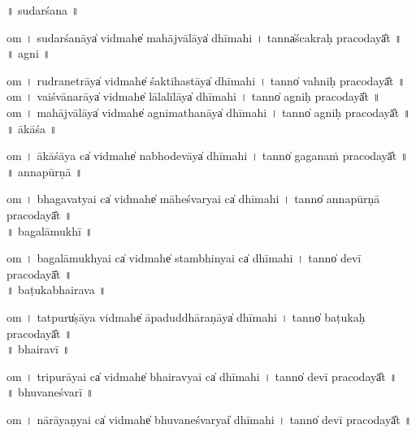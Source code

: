 \documentclass[parskip, DIV=14]{scrartcl}
\begin{document}
\vspace{0.201cm} ॥   sudarśana  ॥ \par
  om  । su॒da॒rśa॒nāya̍ vi॒dmahe̍ mahājvā॒lāya̍ dhīmahi  ।  tanna̍ścakraḥ praco॒dayā̎t ॥ \\

\vspace{0.201cm} ॥   agni  ॥ \par
  om  । ru॒dra॒ne॒trāya̍ vi॒dmahe̍ śaktiha॒stāya̍ dhīmahi  ।  tanno̍ vahniḥ praco॒dayā̎t ॥ \\
  om  । vai॒śvā॒na॒rāya̍  vi॒dmahe̍  lālalīlāya̍  dhīmahi  ।  tanno̍ agniḥ praco॒dayā̎t ॥ \\
  om  । ma॒hā॒jvā॒lāya̍ vi॒dmahe̍  agnimatha॒nāya̍ dhīmahi  ।   tanno̍ agniḥ praco॒dayā̎t ॥ \\

\vspace{0.201cm} ॥   ākāśa  ॥ \par
  om  । ā॒kā॒śā॒ya ca̍ vi॒dmahe̍ nabhode॒vāya̍ dhīmahi  ।  tanno̍ gaganaṁ praco॒dayā̎t ॥ \\

\vspace{0.201cm} ॥   annapūrṇā  ॥ \par
  om  । bha॒ga॒va॒tyai ca̍ vi॒dmahe̍ māheśva॒ryai ca̍ dhīmahi  ।  tanno̍ annapūrṇā praco॒dayā̎t ॥ \\

\vspace{0.201cm} ॥   bagalāmukhī  ॥ \par
  om  । ba॒ga॒lā॒mu॒khyai ca̍ vi॒dmahe̍ stambhi॒nyai ca̍ dhīmahi  ।  tanno̍ devī praco॒dayā̎t ॥ \\

\vspace{0.201cm} ॥   baṭukabhairava  ॥ \par
  om  । tatpuru̍ṣāya vi॒dmahe̍ āpaduddhāra॒ṇāya̍ dhīmahi  ।  tanno̍ baṭukaḥ praco॒dayā̎t ॥ \\

\vspace{0.201cm} ॥   bhairavī  ॥ \par
  om  । tri॒pu॒rā॒yai ca̍ vi॒dmahe̍ bhairavyai ca̍ dhīmahi  ।  tanno̍ devī praco॒dayā̎t ॥ \\

\vspace{0.201cm} ॥   bhuvaneśvarī  ॥ \par
  om  । nārāyaṇyai ca̍ vi॒dmahe̍ bhuvane॒śvaryai̍ dhīmahi  ।  tanno̍ devī praco॒dayā̎t ॥ \\
\end{document}
